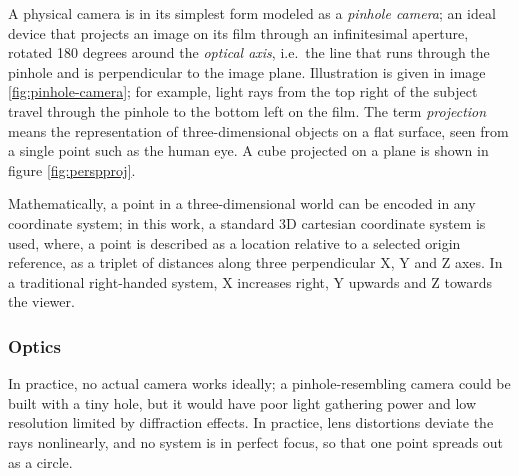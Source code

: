 A physical camera is in its simplest form modeled as a \emph{pinhole camera}; an ideal device that projects an image on its film through an infinitesimal aperture, rotated 180 degrees around the \emph{optical axis}, i.e.\ the line that runs through the pinhole and is perpendicular to the image plane.
Illustration is given in image \ref{fig:pinhole-camera}; for example, light rays from the top right of the subject travel through the pinhole to the bottom left on the film.
The term \emph{projection} means the representation of three-dimensional objects on a flat surface, seen from a single point such as the human eye.
A cube projected on a plane is shown in figure \ref{fig:perspproj}.




Mathematically, a point in a three-dimensional world can be encoded in any coordinate system;
in this work, a standard 3D cartesian coordinate system is used, where, a point is described as a location relative to a selected origin reference, as a triplet of distances along three perpendicular X, Y and Z axes. %
In a traditional right-handed system, X increases right, Y upwards and Z towards the viewer.



\subsubsection{Optics} %


In practice, no actual camera works ideally; a pinhole-resembling camera could be built with a tiny hole, but it would have poor light gathering power and low resolution limited by diffraction effects. \cite{todo}
In practice, lens distortions deviate the rays nonlinearly, and no system is in perfect focus, so that one point spreads out as a circle.

